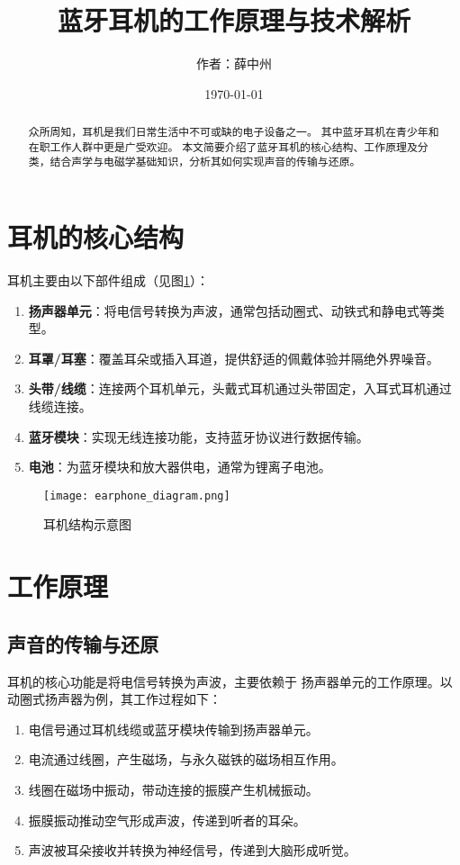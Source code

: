 \documentclass[UTF8]{ctexart}
\title{蓝牙耳机的工作原理与技术解析}
\author{作者：薛中州}
\date{\today}
\begin{document}
\maketitle
\pagestyle{plain}%

\tableofcontents  %
\listoftables     %
\listoffigures    %
\clearpage        %


\begin{abstract}%
众所周知，耳机是我们日常生活中不可或缺的电子设备之一。
其中蓝牙耳机在青少年和在职工作人群中更是广受欢迎。
本文简要介绍了蓝牙耳机的核心结构、工作原理及分类，结合声学与电磁学基础知识，分析其如何实现声音的传输与还原。
\end{abstract}
\section{耳机的核心结构}
耳机主要由以下部件组成（见图\ref{fig:earphone_structure}）：
\begin{enumerate}%
    \item \textbf{扬声器单元}：将电信号转换为声波，通常包括动圈式、动铁式和静电式等类型。
    \item \textbf{耳罩/耳塞}：覆盖耳朵或插入耳道，提供舒适的佩戴体验并隔绝外界噪音。
    \item \textbf{头带/线缆}：连接两个耳机单元，头戴式耳机通过头带固定，入耳式耳机通过线缆连接。
    \item \textbf{蓝牙模块}：实现无线连接功能，支持蓝牙协议进行数据传输。
    \item \textbf{电池}：为蓝牙模块和放大器供电，通常为锂离子电池。
\end{enumerate}%
\begin{figure}  
    \centering
    \texttt{[image: earphone\_diagram.png]} %
    \caption{耳机结构示意图}
    \label{fig:earphone_structure}
\end{figure}
\section{工作原理}
\subsection{声音的传输与还原}
耳机的核心功能是将电信号转换为声波，主要依赖于
扬声器单元的工作原理。以动圈式扬声器为例，其工作过程如下：
\begin{enumerate}
    \item 电信号通过耳机线缆或蓝牙模块传输到扬声器单元。
    \item 电流通过线圈，产生磁场，与永久磁铁的磁场相互作用。
    \item 线圈在磁场中振动，带动连接的振膜产生机械振动。
    \item 振膜振动推动空气形成声波，传递到听者的耳朵。
    \item 声波被耳朵接收并转换为神经信号，传递到大脑形成听觉。
    
\end{enumerate}
\end{document}
